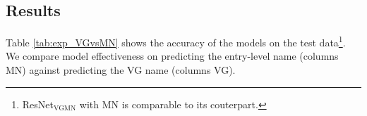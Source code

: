 \subsection{Results}
\label{sect:exp_results}

Table \ref{tab:exp_VGvsMN} shows the accuracy of the models on the \mn test data\footnote{ResNet$_{\text{VGMN}}$ with MN is comparable to its couterpart.}. 
We compare model effectiveness on predicting the entry-level name (columns MN) against predicting the VG name (columns VG). 


